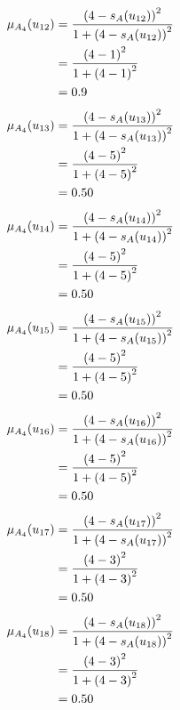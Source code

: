 \documentclass[a4paper,openany]{book}
\begin{document}
				\begin{align}
					\mu_{A_4}(u_{12}) &= \frac{\left(4-s_A(u_{12})\right)^2}{1 + \left(4-s_A(u_{12})\right)^2}\\
					&= \frac{\left(4-1\right)^2}{1 + \left(4-1\right)^2} \notag \\
					&= 0.9 \notag
				\end{align}
				\begin{align}
					\mu_{A_4}(u_{13}) &= \frac{\left(4-s_A(u_{13})\right)^2}{1 + \left(4-s_A(u_{13})\right)^2}\\
					&= \frac{\left(4-5\right)^2}{1 + \left(4-5\right)^2} \notag \\
					&= 0.50 \notag
				\end{align}
				\begin{align}
					\mu_{A_4}(u_{14}) &= \frac{\left(4-s_A(u_{14})\right)^2}{1 + \left(4-s_A(u_{14})\right)^2}\\
					&= \frac{\left(4-5\right)^2}{1 + \left(4-5\right)^2} \notag \\
					&= 0.50 \notag
				\end{align}
				\begin{align}
					\mu_{A_4}(u_{15}) &= \frac{\left(4-s_A(u_{15})\right)^2}{1 + \left(4-s_A(u_{15})\right)^2}\\
					&= \frac{\left(4-5\right)^2}{1 + \left(4-5\right)^2} \notag \\
					&= 0.50 \notag
				\end{align}
				\begin{align}
					\mu_{A_4}(u_{16}) &= \frac{\left(4-s_A(u_{16})\right)^2}{1 + \left(4-s_A(u_{16})\right)^2}\\
					&= \frac{\left(4-5\right)^2}{1 + \left(4-5\right)^2} \notag \\
					&= 0.50 \notag
				\end{align}
				\begin{align}
					\mu_{A_4}(u_{17}) &= \frac{\left(4-s_A(u_{17})\right)^2}{1 + \left(4-s_A(u_{17})\right)^2}\\
					&= \frac{\left(4-3\right)^2}{1 + \left(4-3\right)^2} \notag \\
					&= 0.50 \notag
				\end{align}
				\begin{align}
					\mu_{A_4}(u_{18}) &= \frac{\left(4-s_A(u_{18})\right)^2}{1 + \left(4-s_A(u_{18})\right)^2}\\
					&= \frac{\left(4-3\right)^2}{1 + \left(4-3\right)^2} \notag \\
					&= 0.50 \notag
				\end{align}
\end{document}
